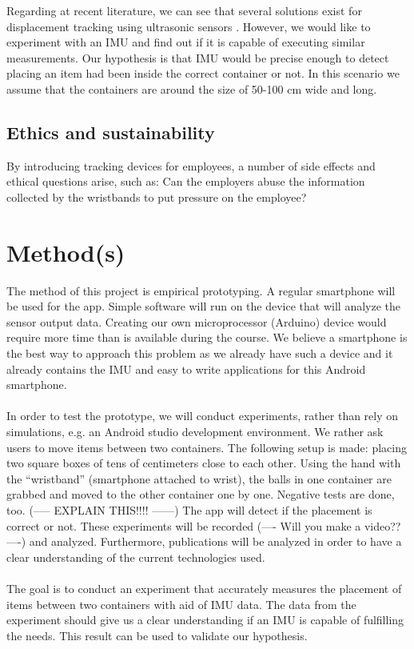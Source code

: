 \documentclass[12pt,twoside, hidelinks]{article}
\begin{document}
Regarding at recent literature, we can see that several solutions exist for displacement tracking using ultrasonic sensors \cite{QiYongbin2014Awwu}. However, we would like to experiment with an IMU and find out if it is capable of executing similar measurements. 
Our hypothesis is that IMU would be precise enough to detect placing an item had been inside the correct container or not. In this scenario we assume that the containers are around the size of 50-100 cm wide and long.

\subsection{Ethics and sustainability}
\label{sect:ethics}

By introducing tracking devices for employees, a number of side effects and ethical questions arise, such as: Can the employers abuse the information collected by the wristbands to put pressure on the employee?


\section{Method(s)}
\label{sec:method}


The method of this project is empirical prototyping. A regular smartphone will be used for the app. Simple software will run on the device that will analyze the sensor output data. Creating our own microprocessor (Arduino) device would require more time than is available during the course. We believe a smartphone is the best way to approach this problem as we already have such a device and it already contains the IMU and easy to write applications for this Android smartphone.
\\
\\
In order to test the prototype, we will conduct experiments, rather than rely on simulations, e.g. an Android studio development environment. We rather ask users to move items between two containers. The following setup is made: placing two square boxes of tens of centimeters close to each other. Using the hand with the “wristband” (smartphone attached to wrist), the balls in one container are grabbed and moved to the other container one by one. Negative tests are done, too. (----- EXPLAIN THIS!!!! ------) The app will detect if the placement is correct or not. These experiments will be recorded (---- Will you make a video?? ----) and analyzed.
Furthermore, publications will be analyzed in order to have a clear understanding of the current technologies used.
\\
\\
The goal is to conduct an experiment that accurately measures the placement of items between two containers with aid of IMU data. The data from the experiment should give us a clear understanding if an IMU is capable of fulfilling the needs. This result can be used to validate our hypothesis.
\end{document}
